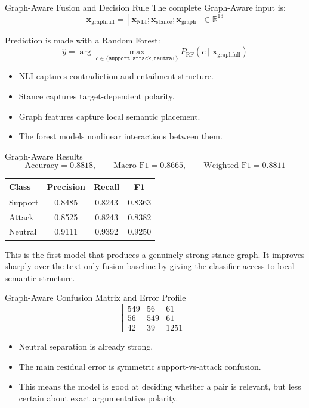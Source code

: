\documentclass[aspectratio=169, 10pt]{beamer}
\newcommand{\takeawaybox}[2]{%
  \begin{tcolorbox}[colback=accentgreen!10, colframe=accentgreen,
    title={\textbf{Takeaway:} #1}, fonttitle=\bfseries\small,
    left=4pt, right=4pt, top=3pt, bottom=3pt, boxrule=1pt]
    \small #2
  \end{tcolorbox}}
\begin{document}
\begin{frame}{Graph-Aware Fusion and Decision Rule}
The complete Graph-Aware input is:
\[
\mathbf{x}_{\mathrm{graphfull}} =
[\mathbf{x}_{\mathrm{NLI}};\mathbf{x}_{\mathrm{stance}};\mathbf{x}_{\mathrm{graph}}]
\in\mathbb{R}^{13}
\]

Prediction is made with a Random Forest:
\[
\hat y = \arg\max_{c\in\{\texttt{support},\texttt{attack},\texttt{neutral}\}}
P_{\mathrm{RF}}(c\mid \mathbf{x}_{\mathrm{graphfull}})
\]

\begin{itemize}
  \item NLI captures contradiction and entailment structure.
  \item Stance captures target-dependent polarity.
  \item Graph features capture local semantic placement.
  \item The forest models nonlinear interactions between them.
\end{itemize}
\end{frame}

\begin{frame}{Graph-Aware Results}
\[
\text{Accuracy}=0.8818,\qquad
\text{Macro-F1}=0.8665,\qquad
\text{Weighted-F1}=0.8811
\]

\begin{center}
\begin{tabular}{lccc}
\toprule
Class & Precision & Recall & F1 \\
\midrule
Support & 0.8485 & 0.8243 & 0.8363 \\
Attack & 0.8525 & 0.8243 & 0.8382 \\
Neutral & 0.9111 & 0.9392 & 0.9250 \\
\bottomrule
\end{tabular}
\end{center}

\takeawaybox{Interpretation}{
This is the first model that produces a genuinely strong stance graph. It improves sharply over the text-only fusion baseline by giving the classifier access to local semantic structure.
}
\end{frame}

\begin{frame}{Graph-Aware Confusion Matrix and Error Profile}
\[
\begin{bmatrix}
549 & 56 & 61 \\
56 & 549 & 61 \\
42 & 39 & 1251
\end{bmatrix}
\]

\begin{itemize}
  \item Neutral separation is already strong.
  \item The main residual error is symmetric support-vs-attack confusion.
  \item This means the model is good at deciding whether a pair is relevant, but less certain about exact argumentative polarity.
\end{itemize}
\end{frame}
\end{document}
